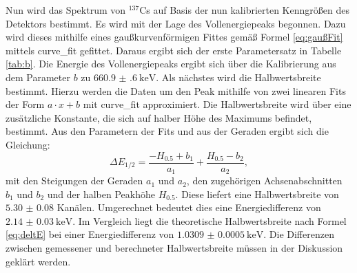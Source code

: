 Nun wird das Spektrum von $^{137}$Cs auf Basis der nun kalibrierten Kenngrößen des Detektors bestimmt. Es wird mit der Lage des Vollenergiepeaks begonnen. Dazu wird dieses mithilfe eines gaußkurvenförmigen Fittes gemäß Formel \eqref{eq:gaußFit} mittels curve\_fit \cite{scipy} gefittet. Daraus ergibt sich der erste Parametersatz in Tabelle \ref{tab:b}.
Die Energie des Vollenergiepeaks ergibt sich über die Kalibrierung aus dem Parameter $b$ zu $\SI{660.9(6)}{\kilo\electronvolt}$.
Als nächstes wird die Halbwertsbreite bestimmt. Hierzu werden die Daten um den Peak mithilfe von zwei linearen Fits der Form $ a \cdot x + b$ mit curve\_fit \cite{scipy} approximiert. Die Halbwertsbreite wird über eine zusätzliche Konstante, die sich auf halber Höhe des Maximums befindet, bestimmt. Aus den Parametern der Fits und aus der Geraden ergibt sich die Gleichung:
\begin{equation}
    \Delta E_\text{1/2} = \frac{-H_{0.5}+b_1}{a_1} + \frac{H_{0.5}-b_2}{a_2}, \label{eq:Z}
\end{equation}
mit den Steigungen der Geraden $a_1$ und $a_2$, den zugehörigen Achsenabschnitten $b_1$ und $b_2$ und der halben Peakhöhe $H_{0.5}$. Diese liefert eine Halbwertsbreite von $\num{5.30(8)}$ Kanälen. Umgerechnet bedeutet dies eine Energiedifferenz von $\SI{2.14(3)}{\kilo\electronvolt}$.
Im Vergleich liegt die theoretische Halbwertsbreite nach Formel \eqref{eq:deltE} bei einer Energiedifferenz von $\SI{1.0309(5)}{\kilo\electronvolt}$. Die Differenzen zwischen gemessener und berechneter Halbwertsbreite müssen in der Diskussion geklärt werden. 
